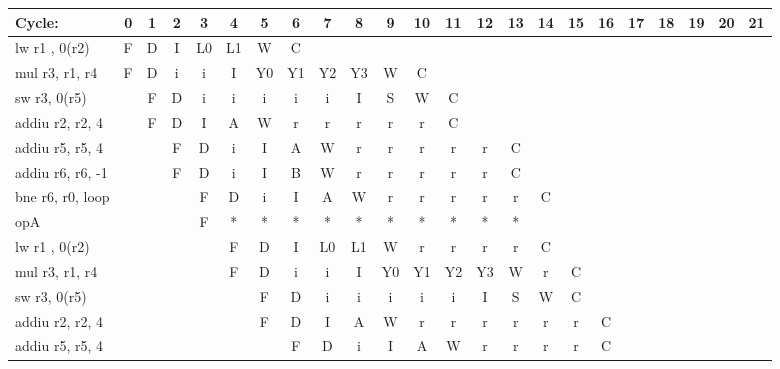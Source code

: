 \documentclass[10pt]{article}
\begin{document}
\begin{figure}[H]
\centering
{\setlength{\tabcolsep}{2pt}
\begin{tabular}{|l|c|c|c|c|c|c|c|c|c|c|c|c|c|c!{\vrule width 1.5pt}c|c|c|c|c|c|c|c!{\vrule width 1.5pt}}
\hline
Cycle:            & 0  & 1  & 2  & 3  & 4  & 5  & 6  & 7  & 8  & 9  & 10 & 11 & 12 & 13 & 14 & 15 & 16 & 17 & 18 & 19 & 20 & 21 \\ \hline
lw r1 , 0(r2)     & F  & D  & I  & L0 & L1 & W  & C  &    &    &    &    &    &    &    &    &    &    &    &    &    &    &    \\ \hline
mul r3, r1, r4    & F  & D  & i  & i  & I  & Y0 & Y1 & Y2 & Y3 & W  & C  &    &    &    &    &    &    &    &    &    &    &    \\ \hline
sw r3, 0(r5)      &    & F  & D  & i  & i  & i  & i  & i  & I  & S  & W  & C  &    &    &    &    &    &    &    &    &    &    \\ \hline
addiu r2, r2, 4   &    & F  & D  & I  & A  & W  & r  & r  & r  & r  & r  & C  &    &    &    &    &    &    &    &    &    &    \\ \hline
addiu r5, r5, 4   &    &    & F  & D  & i  & I  & A  & W  & r  & r  & r  & r  & r  & C  &    &    &    &    &    &    &    &    \\ \hline
addiu r6, r6, -1  &    &    & F  & D  & i  & I  & B  & W  & r  & r  & r  & r  & r  & C  &    &    &    &    &    &    &    &    \\ \hline
bne r6, r0, loop  &    &    &    & F  & D  & i  & I  & A  & W  & r  & r  & r  & r  & r  & C  &    &    &    &    &    &    &    \\ \hline
opA               &    &    &    & F  & *  & *  & *  & *  & *  & *  & *  & *  & *  & *  &    &    &    &    &    &    &    &    \\ \hline
lw r1 , 0(r2)     &    &    &    &    & F  & D  & I  & L0 & L1 & W  & r  & r  & r  & r  & C  &    &    &    &    &    &    &    \\ \hline
mul r3, r1, r4    &    &    &    &    & F  & D  & i  & i  & I  & Y0 & Y1 & Y2 & Y3 & W  & r  & C  &    &    &    &    &    &    \\ \hline
sw r3, 0(r5)      &    &    &    &    &    & F  & D  & i  & i  & i  & i  & i  & I  & S  & W  & C  &    &    &    &    &    &    \\ \hline
addiu r2, r2, 4   &    &    &    &    &    & F  & D  & I  & A  & W  & r  & r  & r  & r  & r  & r  & C  &    &    &    &    &    \\ \hline
addiu r5, r5, 4   &    &    &    &    &    &    & F  & D  & i  & I  & A  & W  & r  & r  & r  & r  & C  &    &    &    &    &    \\ \hline

\end{tabular}}
\end{figure}
\end{document}
